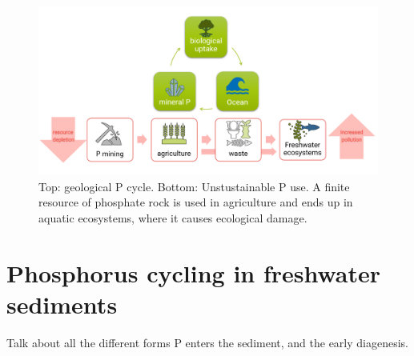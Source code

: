 \documentclass[12pt,twoside]{book}
\begin{document}
\begin{figure}

{\centering \includegraphics[width=1\linewidth]{figure/pcyclelinear} 

}

\caption{Top: geological P cycle. Bottom: Unstustainable P use. A finite resource of phosphate rock is used in agriculture and ends up in aquatic ecosystems, where it causes ecological damage.}\label{fig:pcycle}
\end{figure}

\section{Phosphorus cycling in freshwater sediments}\label{phosphorus-cycling-in-freshwater-sediments}

Talk about all the different forms P enters the sediment, and the early diagenesis.
\end{document}
